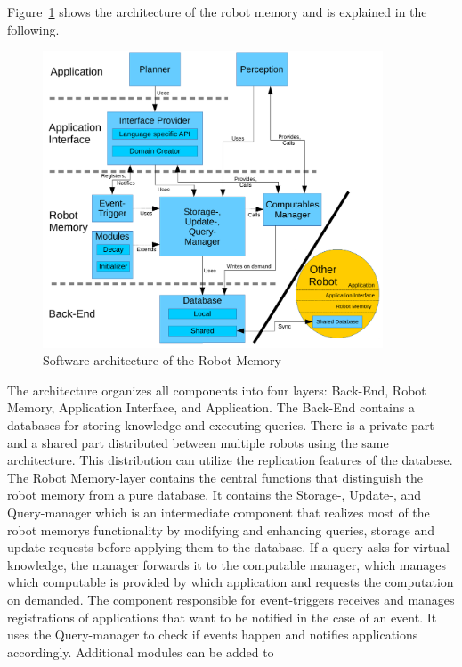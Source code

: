 \documentclass[a4paper,11pt]{article}
\newcommand{\reffig}[1]{Figure~\ref{#1}}
\begin{document}
\reffig{fig:arch} shows the architecture of the robot
memory and is explained in the following.
\begin{figure}
  \centering
  \includegraphics[width=0.9\textwidth]{architecture.pdf}
  \vspace{-5mm}
  \caption{Software architecture of the Robot Memory}
  \label{fig:arch}
  \vspace{-5mm}
\end{figure}
The architecture organizes all components into four layers: Back-End,
Robot Memory, Application Interface, and Application. The Back-End
contains a databases for storing knowledge and executing
queries. There is a private part and a shared part distributed between
multiple robots using the same architecture. This distribution can
utilize the replication features of the databese. The Robot
Memory-layer contains the central functions that distinguish the robot
memory from a pure database. It contains the Storage-, Update-, and
Query-manager which is an intermediate component that realizes most of
the robot memorys functionality by modifying and enhancing queries,
storage and update requests before applying them to the database. If a
query asks for virtual knowledge, the manager forwards it to the
computable manager, which manages which computable is provided by
which application and requests the computation on demanded. The
component responsible for event-triggers receives and manages
registrations of applications that want to be notified in the case of
an event. It uses the Query-manager to check if events happen and
notifies applications accordingly. Additional modules can be added to
\end{document}

